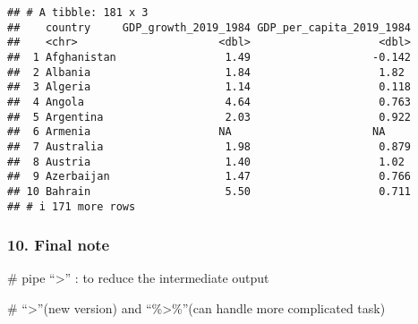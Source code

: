 \documentclass[
]{article}
\begin{document}
\begin{verbatim}
## # A tibble: 181 x 3
##    country     GDP_growth_2019_1984 GDP_per_capita_2019_1984
##    <chr>                      <dbl>                    <dbl>
##  1 Afghanistan                 1.49                   -0.142
##  2 Albania                     1.84                    1.82 
##  3 Algeria                     1.14                    0.118
##  4 Angola                      4.64                    0.763
##  5 Argentina                   2.03                    0.922
##  6 Armenia                    NA                      NA    
##  7 Australia                   1.98                    0.879
##  8 Austria                     1.40                    1.02 
##  9 Azerbaijan                  1.47                    0.766
## 10 Bahrain                     5.50                    0.711
## # i 171 more rows
\end{verbatim}

\hypertarget{final-note}{%
\subsubsection{10. Final note}\label{final-note}}

\# pipe ``\textbar\textgreater{}'' : to reduce the intermediate output

\# ``\textbar\textgreater{}''(new version) and ``\%\textgreater\%''(can
handle more complicated task)
\end{document}
